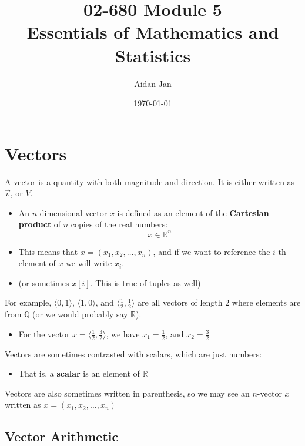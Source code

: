 \documentclass[10pt]{article}
\title{02-680 Module 5 \\ \large{Essentials of Mathematics and Statistics}}
\author{Aidan Jan}
\date{\today}
\begin{document}
\maketitle

\section*{Vectors}
A vector is a quantity with both magnitude and direction.  It is either written as $\vec{v}$, or $V$.
\begin{itemize}
	\item An $n$-dimensional vector $x$ is defined as an element of the \textbf{Cartesian product} of $n$ copies of the real numbers:
	\[x \in \mathbb{R}^n\]
    \item This means that $x = (x_1, x_2, \dots, x_n)$, and if we want to reference the $i$-th element of $x$ we will write $x_i$.
    \item (or sometimes $x[i]$.  This is true of tuples as well)
\end{itemize}
For example, $\langle 0, 1 \rangle$, $\langle 1, 0 \rangle$, and $\langle \frac{1}{2}, \frac{1}{2} \rangle$ are all vectors of length $2$ where elements are from $\mathbb{Q}$ (or we would probably say $\mathbb{R}$).
\begin{itemize}
	\item For the vector $x = \langle \frac{1}{2}, \frac{3}{2} \rangle$, we have $x_1 = \frac{1}{2}$, and $x_2 = \frac{3}{2}$
\end{itemize}
Vectors are sometimes contrasted with scalars, which are just numbers:
\begin{itemize}
	\item That is, a \textbf{scalar} is an element of $\mathbb{R}$
\end{itemize}
Vectors are also sometimes written in parenthesis, so we may see an $n$-vector $x$ written as $x = (x_1, x_2, \dots, x_n)$

\subsection*{Vector Arithmetic}
\end{document}
